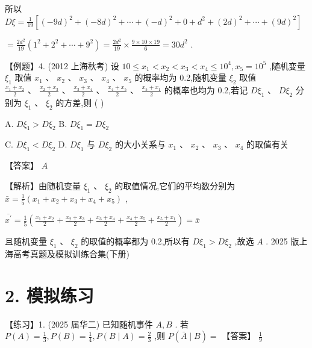 \documentclass[10pt]{article}
\begin{document}
所以 \({D\xi } = \frac{1}{19}\left\lbrack  {{\left( -9d\right) }^{2} + {\left( -8d\right) }^{2} + \cdots  + {\left( -d\right) }^{2} + 0 + {d}^{2} + {\left( 2d\right) }^{2} + \cdots  + {\left( 9d\right) }^{2}}\right\rbrack\)

\(= \frac{2{d}^{2}}{19}\left( {{1}^{2} + {2}^{2} + \cdots  + {9}^{2}}\right)  = \frac{2{d}^{2}}{19} \times  \frac{9 \times  {10} \times  {19}}{6} = {30}{d}^{2}\) .

【例题】4. (2012 上海秋考) 设 \({10} \leq  {x}_{1} < {x}_{2} < {x}_{3} < {x}_{4} \leq  {10}^{4},{x}_{5} = {10}^{5}\) ,随机变量 \({\xi }_{1}\) 取值 \({x}_{1}\text{ 、 }{x}_{2}\text{ 、 }{x}_{3}\text{ 、 }{x}_{4}\text{ 、 }{x}_{5}\) 的概率均为 0.2,随机变量 \({\xi }_{2}\) 取值 \(\frac{{x}_{1} + {x}_{2}}{2}\text{ 、 }\frac{{x}_{2} + {x}_{3}}{2}\text{ 、 }\frac{{x}_{3} + {x}_{4}}{2}\text{ 、 }\frac{{x}_{4} + {x}_{5}}{2}\text{ 、 }\frac{{x}_{5} + {x}_{1}}{2}\) 的概率也均为 0.2,若记 \(D{\xi }_{1}\text{ 、 }D{\xi }_{2}\) 分别为 \({\xi }_{1}\text{ 、 }{\xi }_{2}\) 的方差,则 ( )

A. \(D{\xi }_{1} > D{\xi }_{2}\) B. \(D{\xi }_{1} = D{\xi }_{2}\)

C. \(D{\xi }_{1} < D{\xi }_{2}\) D. \(D{\xi }_{1}\) 与 \(D{\xi }_{2}\) 的大小关系与 \({x}_{1}\text{ 、 }{x}_{2}\text{ 、 }{x}_{3}\text{ 、 }{x}_{4}\) 的取值有关

【答案】 \(A\)

【解析】由随机变量 \({\xi }_{1}\text{ 、 }{\xi }_{2}\) 的取值情况,它们的平均数分别为 \(\bar{x} = \frac{1}{5}\left( {{x}_{1} + {x}_{2} + {x}_{3} + {x}_{4} + {x}_{5}}\right)\) ,

\(\overline{{x}^{\prime }} = \frac{1}{5}\left( {\frac{{x}_{1} + {x}_{2}}{2} + \frac{{x}_{2} + {x}_{3}}{2} + \frac{{x}_{3} + {x}_{4}}{2} + \frac{{x}_{4} + {x}_{5}}{2} + \frac{{x}_{5} + {x}_{1}}{2}}\right)  = \bar{x}\)

且随机变量 \({\xi }_{1}\text{ 、 }{\xi }_{2}\) 的取值的概率都为 0.2,所以有 \(D{\xi }_{1} > D{\xi }_{2}\) ,故选 \(A\) . 2025 版上海高考真题及模拟训练合集(下册)

\section*{2. 模拟练习}

【练习】1. (2025 届华二) 已知随机事件 \(A,B\) . 若 \(P\left( A\right)  = \frac{1}{3},P\left( B\right)  = \frac{1}{4},P\left( {B \mid  A}\right)  = \frac{2}{3}\) ,则 \(P\left( {\bar{A} \mid  B}\right)  =\) 【答案】 \(\frac{1}{9}\)
\end{document}
